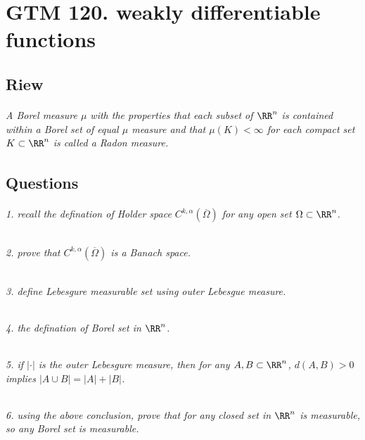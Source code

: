 \chapter{GTM 120. weakly differentiable functions}

\section{Riew}

\subparagraph{A Borel measure $\mu$ with the properties that each subset of $\RR^{n}$
is contained within a Borel set of equal $\mu$ measure and that $\mu\left(K\right)<\infty$
for each compact set $K\subset\RR^{n}$ is called a Radon measure.}

\section{Questions}

\subparagraph{1. recall the defination of Holder space $C^{k,\alpha}\left(\overline{\Omega}\right)$
for any open set $\Omega\subset\RR^{n}$.}

\subparagraph{2. prove that $C^{k,\alpha}\left(\overline{\Omega}\right)$ is a
Banach space.}

\subparagraph{3. define Lebesgure measurable set using outer Lebesgue measure.}

\subparagraph{4. the defination of Borel set in $\RR^{n}$.}

\subparagraph{5. if $\left|\cdot\right|$ is the outer Lebesgure measure, then
for any $A,B\subset\RR^{n}$, $d\left(A,B\right)>0$ implies $\left|A\cup B\right|=\left|A\right|+\left|B\right|$.}

\subparagraph{6. using the above conclusion, prove that for any closed set in $\RR^{n}$
is measurable, so any Borel set is measurable.}